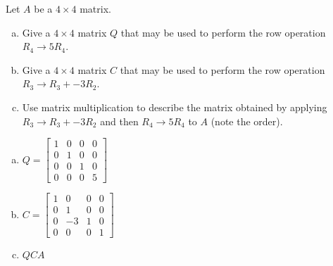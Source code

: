 
\begin{exerciseStatement}


Let \(A\) be a \(4 \times 4\) matrix.


\begin{enumerate}[(a)]
\item Give a \(4 \times 4\) matrix \(Q\) that may be used to perform the row operation \( R_4 \to 5R_4 \).
\item Give a \(4 \times 4\) matrix \(C\) that may be used to perform the row operation \( R_3 \to R_3 + -3R_2 \).
\item Use matrix multiplication to describe the matrix obtained by applying \( R_3 \to R_3 + -3R_2 \) and then \( R_4 \to 5R_4 \) to \(A\) (note the order). 
\end{enumerate}
    
\end{exerciseStatement}
    
\begin{exerciseAnswer} 

\begin{enumerate}[(a)]
\item \(Q= \left[\begin{array}{cccc}
1 & 0 & 0 & 0 \\
0 & 1 & 0 & 0 \\
0 & 0 & 1 & 0 \\
0 & 0 & 0 & 5
\end{array}\right] \)
\item \(C= \left[\begin{array}{cccc}
1 & 0 & 0 & 0 \\
0 & 1 & 0 & 0 \\
0 & -3 & 1 & 0 \\
0 & 0 & 0 & 1
\end{array}\right] \)
\item \(QCA\)
\end{enumerate}
    
\end{exerciseAnswer}
    
